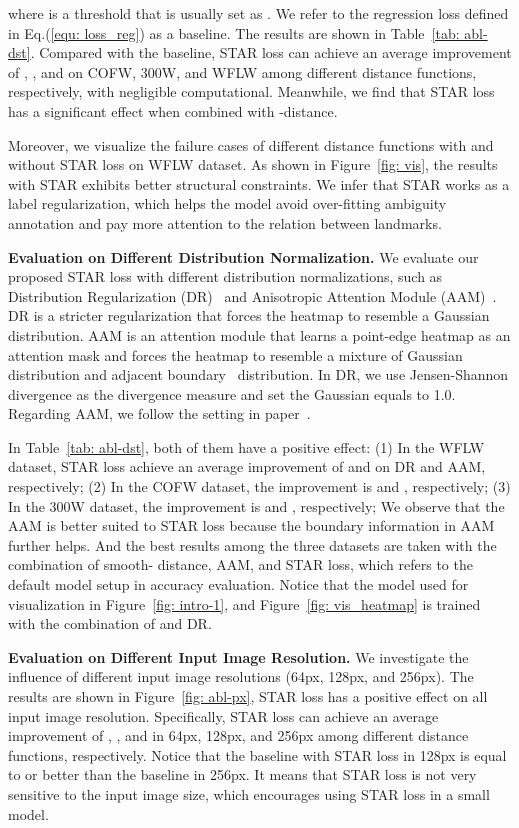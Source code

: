 \documentclass[10pt,twocolumn,letterpaper]{article}
\begin{document}
where  is a threshold that is usually set as .
We refer to the regression loss defined in Eq.(\ref{equ: loss_reg}) as a baseline.
The results are shown in Table~\ref{tab: abl-dst}.
Compared with the baseline, STAR loss can achieve an average improvement of , , and  on COFW, 300W, and WFLW among different distance functions, respectively, with negligible computational.
Meanwhile, we find that STAR loss has a significant effect when combined with -distance.

Moreover, we visualize the failure cases of different distance functions with and without STAR loss on WFLW dataset.
As shown in Figure~\ref{fig: vis}, the results with STAR exhibits better structural constraints. We infer that STAR works as a label regularization, which helps the model avoid over-fitting ambiguity annotation and pay more attention to the relation between landmarks.


\noindent\textbf{Evaluation on Different Distribution Normalization.}
We evaluate our proposed STAR loss with different distribution normalizations, such as Distribution Regularization (DR)~\cite{nibali2018numerical} and Anisotropic Attention Module (AAM)~\cite{huang2021adnet}. DR is a stricter regularization that forces the heatmap to resemble a Gaussian distribution. AAM is an attention module that learns a point-edge heatmap as an attention mask and forces the heatmap to resemble a mixture of Gaussian distribution and adjacent boundary~\cite{kumar2020luvli} distribution.
In DR, we use Jensen-Shannon divergence as the divergence measure and set the Gaussian  equals to 1.0.
Regarding AAM, we follow the setting in paper~\cite{huang2021adnet}.

In Table~\ref{tab: abl-dst}, both of them have a positive effect:
(1) In the WFLW dataset, STAR loss achieve an average improvement of  and  on DR and AAM, respectively;
(2) In the COFW dataset, the improvement is  and , respectively;
(3) In the 300W dataset, the improvement is  and , respectively;
We observe that the AAM is better suited to STAR loss because the boundary information in AAM further helps.
And the best results among the three datasets are taken with the combination of smooth- distance, AAM, and STAR loss, which refers to the default model setup in accuracy evaluation.
Notice that the model used for visualization in Figure~\ref{fig: intro-1}, and Figure~\ref{fig: vis_heatmap} is trained with the combination of  and DR.

\noindent\textbf{Evaluation on Different Input Image Resolution.}
We investigate the influence of different input image resolutions (64px, 128px, and 256px). 
The results are shown in Figure~\ref{fig: abl-px}, STAR loss has a positive effect on all input image resolution. 
Specifically, STAR loss can achieve an average improvement of , , and  in 64px, 128px, and 256px among different distance functions, respectively. 
Notice that the baseline with STAR loss in 128px is equal to or better than the baseline in 256px.
It means that STAR loss is not very sensitive to the input image size, which encourages using STAR loss in a small model.
\end{document}
